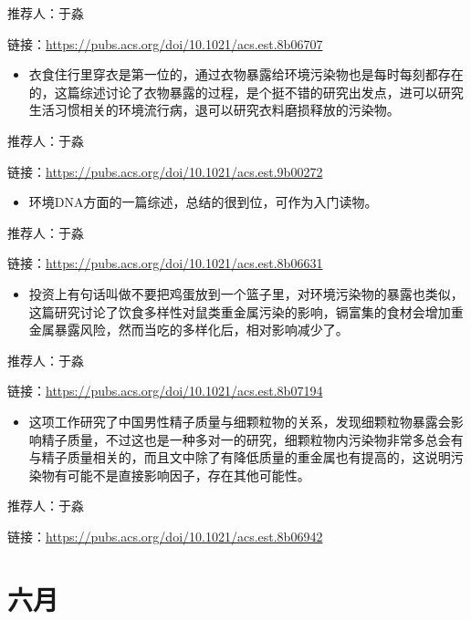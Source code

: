 \documentclass[]{book}
\providecommand{\tightlist}{%
  \setlength{\itemsep}{0pt}\setlength{\parskip}{0pt}}
\begin{document}
推荐人：于淼

链接：\url{https://pubs.acs.org/doi/10.1021/acs.est.8b06707}

\begin{itemize}
\tightlist
\item
  衣食住行里穿衣是第一位的，通过衣物暴露给环境污染物也是每时每刻都存在的，这篇综述讨论了衣物暴露的过程，是个挺不错的研究出发点，进可以研究生活习惯相关的环境流行病，退可以研究衣料磨损释放的污染物。
\end{itemize}

推荐人：于淼

链接：\url{https://pubs.acs.org/doi/10.1021/acs.est.9b00272}

\begin{itemize}
\tightlist
\item
  环境DNA方面的一篇综述，总结的很到位，可作为入门读物。
\end{itemize}

推荐人：于淼

链接：\url{https://pubs.acs.org/doi/10.1021/acs.est.8b06631}

\begin{itemize}
\tightlist
\item
  投资上有句话叫做不要把鸡蛋放到一个篮子里，对环境污染物的暴露也类似，这篇研究讨论了饮食多样性对鼠类重金属污染的影响，镉富集的食材会增加重金属暴露风险，然而当吃的多样化后，相对影响减少了。
\end{itemize}

推荐人：于淼

链接：\url{https://pubs.acs.org/doi/10.1021/acs.est.8b07194}

\begin{itemize}
\tightlist
\item
  这项工作研究了中国男性精子质量与细颗粒物的关系，发现细颗粒物暴露会影响精子质量，不过这也是一种多对一的研究，细颗粒物内污染物非常多总会有与精子质量相关的，而且文中除了有降低质量的重金属也有提高的，这说明污染物有可能不是直接影响因子，存在其他可能性。
\end{itemize}

推荐人：于淼

链接：\url{https://pubs.acs.org/doi/10.1021/acs.est.8b06942}

\hypertarget{ux516dux6708-1}{%
\section*{六月}\label{ux516dux6708-1}}
\end{document}

